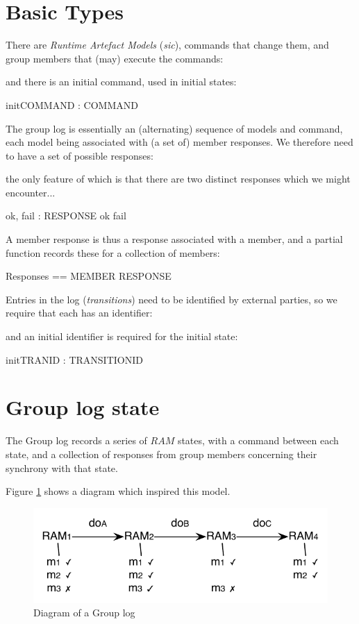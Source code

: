 \documentclass[a4paper,12pt]{article}
\begin{document}
\section{Basic Types}
\label{cha:basic}

There are \emph{Runtime Artefact Models} ({\it sic}), commands that change them, and group members that (may) execute the commands:
\begin{zed}
\end{zed}
and there is an initial command, used in initial states:
\begin{axdef}
	initCOMMAND : COMMAND
\end{axdef}

The group log is essentially an (alternating) sequence of models and command, each model being associated with (a set of) member responses. We therefore need to have a set of possible responses:
\begin{zed}
	[RESPONSE]
\end{zed}
the only feature of which is that there are two distinct responses which we might encounter...
\begin{axdef}
	ok, fail : RESPONSE
\where
	ok \neq fail	
\end{axdef}

A member response is thus a response associated with a member, and a partial function records these for a collection of members:
\begin{zed}
	Responses == MEMBER \pfun RESPONSE
\end{zed}

Entries in the log (\emph{transitions}) need to be identified by external parties, so we require that each has an identifier:
\begin{zed}
	[TRANSITIONID]
\end{zed}	
and an initial identifier is required for the initial state:
\begin{axdef}
	initTRANID : TRANSITIONID
\end{axdef}

\section{Group log state}
The Group log records a series of $RAM$ states, with a command between each state, and a collection of responses from group members concerning their synchrony with that state.

Figure \ref{fig:grouplog1} shows a diagram which inspired this model.
\begin{figure}[h]
\centering
\includegraphics*[scale=1.0]{grouplog1.pdf}
\caption{Diagram of a Group log}
\label{fig:grouplog1}
\end{figure}
\end{document}
